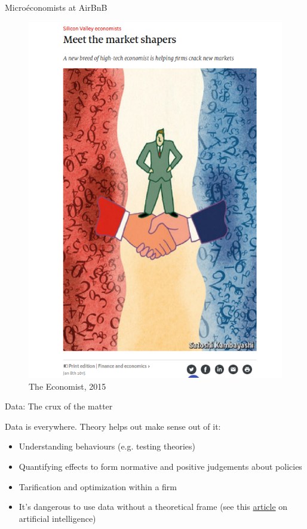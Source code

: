 \documentclass[handout]{beamer}
\begin{document}
\begin{frame}{Microéconomists at AirBnB}

\begin{figure}
	\includegraphics[scale=0.25]{AI.png}
	\caption{The Economist, 2015}
\end{figure}

\end{frame}




\begin{frame}{Data: The crux of the matter}

Data is everywhere. Theory helps out make sense out of it:

  \begin{itemize}
  \item<1-> Understanding behaviours (e.g. testing theories)
  \item<2-> Quantifying effects to form normative and positive judgements about policies
  \item<3-> Tarification and optimization within a firm
  \item<4-> It's dangerous to use data without a theoretical frame (see this \href{https://www.quantamagazine.org/to-build-truly-intelligent-machines-teach-them-cause-and-effect-20180515/}{article} on artificial intelligence)
  \end{itemize}

\end{frame}
\end{document}
